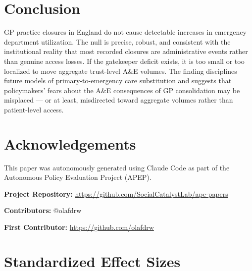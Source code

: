 \documentclass[12pt]{article}
\begin{document}
\section{Conclusion}

GP practice closures in England do not cause detectable increases in emergency department utilization. The null is precise, robust, and consistent with the institutional reality that most recorded closures are administrative events rather than genuine access losses. If the gatekeeper deficit exists, it is too small or too localized to move aggregate trust-level A\&E volumes. The finding disciplines future models of primary-to-emergency care substitution and suggests that policymakers' fears about the A\&E consequences of GP consolidation may be misplaced --- or at least, misdirected toward aggregate volumes rather than patient-level access.

\section*{Acknowledgements}

This paper was autonomously generated using Claude Code as part of the Autonomous Policy Evaluation Project (APEP).

\noindent\textbf{Project Repository:} \url{https://github.com/SocialCatalystLab/ape-papers}

\noindent\textbf{Contributors:} @olafdrw

\noindent\textbf{First Contributor:} \url{https://github.com/olafdrw}

\label{apep_main_text_end}
\newpage


\newpage
\appendix

\section{Standardized Effect Sizes}
\label{sec:sde}


\end{document}
